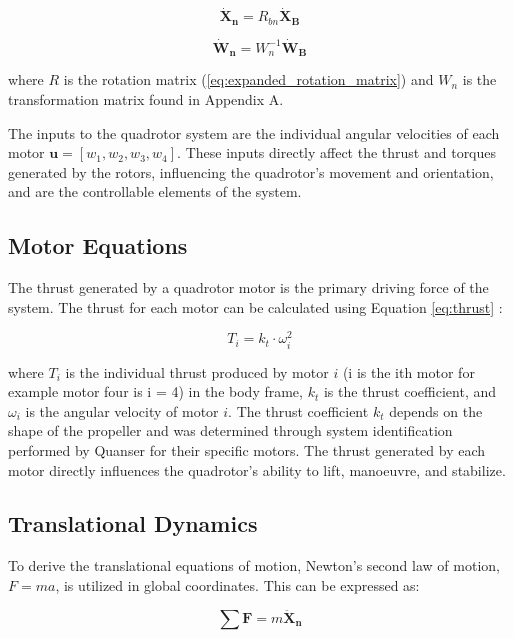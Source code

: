 \documentclass{UoNMCHA}
\numberwithin{equation}{section}
\begin{document}
\begin{equation}
\mathbf{\dot{X}_n} = R_{bn} \mathbf{\dot{X}_B}
\label{eq:velocity_transformation}
\end{equation}

\begin{equation}
\mathbf{\dot{W}_n} = W_n^{-1} \mathbf{\dot{W}_B}
\label{eq:angular_velocity_transformation}
\end{equation}
    

where \(R\) is the rotation matrix (\ref{eq:expanded_rotation_matrix}) and \(W_n\) is the transformation matrix found in Appendix A.

The inputs to the quadrotor system are the individual angular velocities of each motor \(\mathbf{u} = [w_1, w_2, w_3, w_4]\). These inputs directly affect the thrust and torques generated by the rotors, influencing the quadrotor's movement and orientation, and are the controllable elements of the system.

\subsection{Motor Equations}
The thrust generated by a quadrotor motor is the primary driving force of the system. The thrust for each motor can be calculated using Equation \ref{eq:thrust} \cite{HindawiDynamcis}:

\begin{equation}
T_i = k_t \cdot \omega_i^2
\label{eq:thrust}
\end{equation}

where \(T_i\) is the individual thrust produced by motor \(i\) (i is the ith motor for example motor four is i = 4) in the body frame, \(k_t\) is the thrust coefficient, and \(\omega_i\) is the angular velocity of motor \(i\). The thrust coefficient \(k_t\) depends on the shape of the propeller and was determined through system identification performed by Quanser for their specific motors. The thrust generated by each motor directly influences the quadrotor's ability to lift, manoeuvre, and stabilize.
\subsection{Translational Dynamics}
To derive the translational equations of motion, Newton's second law of motion, \( F = ma \), is utilized in global coordinates. This can be expressed as:

\begin{equation}
\sum \mathbf{F} = m \mathbf{\ddot{X}_n}
\label{eq:newton_law}
\end{equation}
\end{document}

